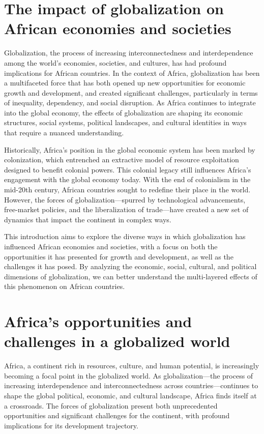 \documentclass[10pt]{article}
\begin{document}
\section*{The impact of globalization on African economies and societies}
Globalization, the process of increasing interconnectedness and interdependence among the
world's economies, societies, and cultures, has had profound implications for African countries.
In the context of Africa, globalization has been a multifaceted force that has both opened up
new opportunities for economic growth and development, and created significant challenges,
particularly in terms of inequality, dependency, and social disruption. As Africa continues to
integrate into the global economy, the effects of globalization are shaping its economic
structures, social systems, political landscapes, and cultural identities in ways that require a
nuanced understanding.

Historically, Africa's position in the global economic system has been marked by colonization,
which entrenched an extractive model of resource exploitation designed to benefit colonial
powers. This colonial legacy still influences Africa's engagement with the global economy today.
With the end of colonialism in the mid-20th century, African countries sought to redefine their
place in the world. However, the forces of globalization---spurred by technological
advancements, free-market policies, and the liberalization of trade---have created a new set of
dynamics that impact the continent in complex ways.

This introduction aims to explore the diverse ways in which globalization has influenced African
economies and societies, with a focus on both the opportunities it has presented for growth
and development, as well as the challenges it has posed. By analyzing the economic, social,
cultural, and political dimensions of globalization, we can better understand the multi-layered
effects of this phenomenon on African countries.

\section*{Africa's opportunities and challenges in a globalized world}
Africa, a continent rich in resources, culture, and human potential, is increasingly becoming a
focal point in the globalized world. As globalization---the process of increasing interdependence
and interconnectedness across countries---continues to shape the global political, economic,
and cultural landscape, Africa finds itself at a crossroads. The forces of globalization present
both unprecedented opportunities and significant challenges for the continent, with profound
implications for its development trajectory.
\end{document}
